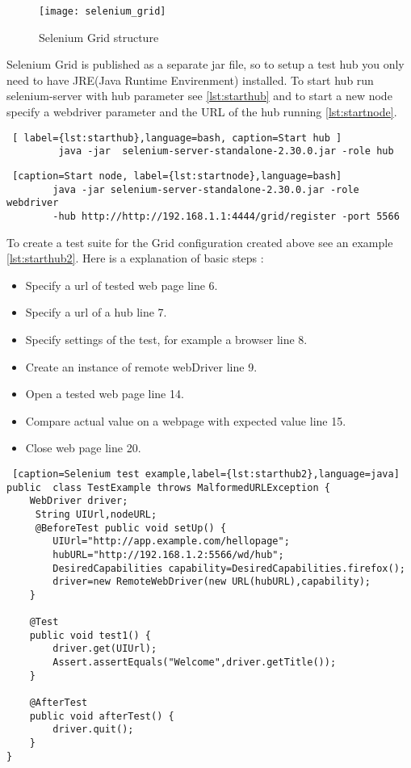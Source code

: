 		\begin{figure}
		\label{fig:webdriver}
		\texttt{[image: selenium\_grid]}
		\caption{Selenium Grid structure}
		\end{figure}
		
		Selenium Grid is published as a separate jar file, so to setup a test hub you
		only need to have JRE(Java Runtime Envirenment) installed. To start hub run
		selenium-server with hub parameter see \ref{lst:starthub} and to start a new
		node specify a webdriver parameter and the URL of the hub running \ref{lst:startnode}.
		
		\begin{lstlisting} [ label={lst:starthub},language=bash, caption=Start hub ]
		 java -jar	selenium-server-standalone-2.30.0.jar -role hub
		\end{lstlisting}

		\begin{lstlisting} [caption=Start node, label={lst:startnode},language=bash]
		java -jar selenium-server-standalone-2.30.0.jar -role webdriver
		-hub http://http://192.168.1.1:4444/grid/register -port 5566
		\end{lstlisting}
		

	To create a test suite for the Grid configuration created above see an
	example \ref{lst:starthub2}. Here is a explanation of basic steps :
	\begin{itemize}
	  \item Specify a url of tested web page line 6.
	  \item Specify a url of a hub line 7.
	  \item Specify settings of the test, for example a browser line 8.
	  \item Create an instance of remote webDriver line 9.
	  \item Open a tested web page line 14.
	  \item Compare actual value on a webpage with expected value line 15.
	  \item Close web page line 20.
	\end{itemize}
	
	\lstset{style=a1listing}
	\begin{lstlisting} [caption=Selenium test example,label={lst:starthub2},language=java]
public 	class TestExample throws MalformedURLException {
 	WebDriver driver;
 	 String UIUrl,nodeURL;
 	 @BeforeTest public void setUp() {
 	 	UIUrl="http://app.example.com/hellopage"; 
		hubURL="http://192.168.1.2:5566/wd/hub";
		DesiredCapabilities capability=DesiredCapabilities.firefox();
		driver=new RemoteWebDriver(new URL(hubURL),capability);
	}
		
	@Test
	public void test1() {
		driver.get(UIUrl);
		Assert.assertEquals("Welcome",driver.getTitle());
	}
	
	@AfterTest
	public void afterTest() {
		driver.quit();
	}
}
	\end{lstlisting}

